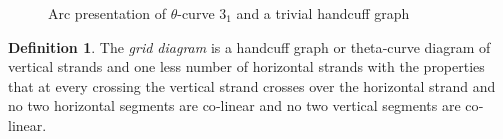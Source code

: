 \documentclass{article}
\theoremstyle{definition}
\newtheorem{defn}[thm]{Definition}
\theoremstyle{theorem}
\theoremstyle{proposition}
\theoremstyle{corollary}
\begin{document}
\begin{figure}[h]
    \centering
    \caption{Arc presentation of $\theta$-curve $3_1$ and a trivial handcuff graph}
    \label{figure_1} 
\end{figure}


\begin{defn}
    The \textit{grid diagram} is a handcuff graph or theta‐curve diagram of vertical strands and one less number of horizontal strands with the properties that at every crossing the vertical strand crosses over the horizontal strand and no two horizontal segments are co‐linear and no two vertical segments are co‐linear.
\end{defn}
\end{document}
